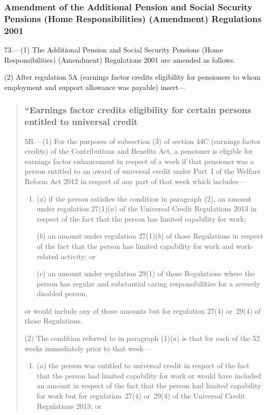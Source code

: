 \documentclass[12pt,a4paper]{article}
\begin{document}
\subsubsection[73. Amendment of the Additional Pension and Social Security Pensions (Home Responsibilities) (Amendment) Regulations 2001]{Amendment of the Additional Pension and Social Security Pensions (Home Responsibilities) (Amendment) Regulations 2001}

73.—(1) The Additional Pension and Social Security Pensions (Home Responsibilities) (Amendment) Regulations 2001 are amended as follows.

(2) After regulation 5A (earnings factor credits eligibility for pensioners to whom employment and support allowance was payable) insert—
\begin{quotation}
\subsubsection*{“Earnings factor credits eligibility for certain persons entitled to universal credit}

5B.—(1) For the purposes of subsection (3) of section 44C (earnings factor credits) of the Contributions and Benefits Act, a pensioner is eligible for earnings factor enhancement in respect of a week if that pensioner was a person entitled to an award of universal credit under Part~I of the Welfare Reform Act 2012 in respect of any part of that week which includes—
\begin{enumerate}\item[]
($a$) if the person satisfies the condition in paragraph (2), an amount under regulation 27(1)($a$)  of the Universal Credit Regulations 2013 in respect of the fact that the person has limited capability for work;

($b$) an amount under regulation 27(1)($b$)  of those Regulations in respect of the fact that the person has limited capability for work and work-related activity; or

($c$) an amount under regulation 29(1) of those Regulations where the person has regular and substantial caring responsibilities for a severely disabled person,
\end{enumerate}
or would include any of those amounts but for regulation 27(4) or~29(4) of those Regulations.

(2) The condition referred to in paragraph (1)($a$)  is that for each of the 52 weeks immediately prior to that week—
\begin{enumerate}\item[]
($a$) the person was entitled to universal credit in respect of the fact that the person had limited capability for work or would have included an amount in respect of the fact that the person had limited capability for work but for regulation~27(4) or~29(4) of the Universal Credit Regulations 2013; or


\end{enumerate}
\end{quotation}
\end{document}
